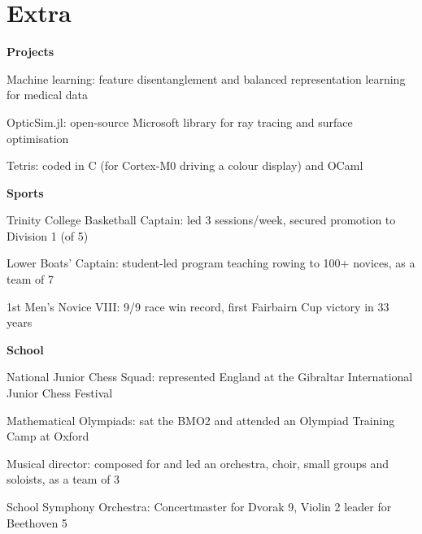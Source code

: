 \documentclass[letterpaper, 10pt]{article}
\begin{document}
\section*{Extra}
\textbf{Projects}
\begin{compact}
	\item Machine learning: feature disentanglement and balanced representation learning for medical data \hfill \href{https://github.com/alfredclwong/ite-feature-selection}{\faGithub}
	\item OpticSim.jl: open-source Microsoft library for ray tracing and surface optimisation \hfill \href{https://github.com/microsoft/OpticSim.jl}{\faGithub}
	\item Tetris: coded in C (for Cortex-M0 driving a colour display) and OCaml \hfill \href{https://github.com/alfredclwong/4b25-tetris}{\faGithub} \href{https://github.com/alfredclwong/tetris-ocaml}{\faGithub}
\end{compact}
\vspace{.5\baselineskip}
\textbf{Sports}
\begin{compact}
	\item Trinity College Basketball Captain: led 3 sessions/week, secured promotion to Division 1 (of 5)
	\item Lower Boats' Captain: student-led program teaching rowing to 100+ novices, as a team of 7
	\item 1st Men's Novice VIII: 9/9 race win record, first Fairbairn Cup victory in 33 years
\end{compact}
\vspace{.5\baselineskip}
\textbf{School}
\begin{compact}
	\item National Junior Chess Squad: represented England at the Gibraltar International Junior Chess Festival
	\item Mathematical Olympiads: sat the BMO2 and attended an Olympiad Training Camp at Oxford
	\item Musical director: composed for and led an orchestra, choir, small groups and soloists, as a team of 3
	\item School Symphony Orchestra: Concertmaster for Dvorak 9, Violin 2 leader for Beethoven 5
\end{compact}

\end{document}
